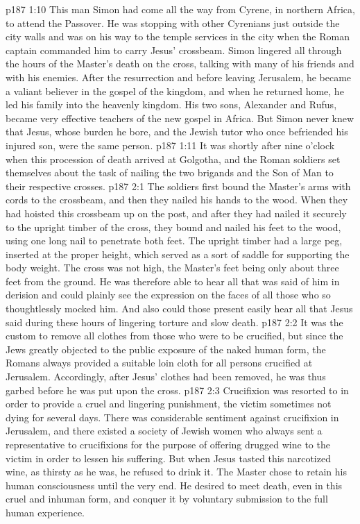 \pc \vs p187 1:10 This man Simon had come all the way from Cyrene, in northern Africa, to attend the Passover. He was stopping with other Cyrenians just outside the city walls and was on his way to the temple services in the city when the Roman captain commanded him to carry Jesus’ crossbeam. Simon lingered all through the hours of the Master’s death on the cross, talking with many of his friends and with his enemies. After the resurrection and before leaving Jerusalem, he became a valiant believer in the gospel of the kingdom, and when he returned home, he led his family into the heavenly kingdom. His two sons, Alexander and Rufus, became very effective teachers of the new gospel in Africa. But Simon never knew that Jesus, whose burden he bore, and the Jewish tutor who once befriended his injured son, were the same person.
\pc \vs p187 1:11 It was shortly after nine o’clock when this procession of death arrived at Golgotha, and the Roman soldiers set themselves about the task of nailing the two brigands and the Son of Man to their respective crosses.\plusone
{}
\vs p187 2:1 The soldiers first bound the Master’s arms with cords to the crossbeam, and then they nailed his hands to the wood. When they had hoisted this crossbeam up on the post, and after they had nailed it securely to the upright timber of the cross, they bound and nailed his feet to the wood, using one long nail to penetrate both feet. The upright timber had a large peg, inserted at the proper height, which served as a sort of saddle for supporting the body weight. The cross was not high, the Master’s feet being only about three feet from the ground. He was therefore able to hear all that was said of him in derision and could plainly see the expression on the faces of all those who so thoughtlessly mocked him. And also could those present easily hear all that Jesus said during these hours of lingering torture and slow death.
\vs p187 2:2 It was the custom to remove all clothes from those who were to be crucified, but since the Jews greatly objected to the public exposure of the naked human form, the Romans always provided a suitable loin cloth for all persons crucified at Jerusalem. Accordingly, after Jesus’ clothes had been removed, he was thus garbed before he was put upon the cross.
\vs p187 2:3 Crucifixion was resorted to in order to provide a cruel and lingering punishment, the victim sometimes not dying for several days. There was considerable sentiment against crucifixion in Jerusalem, and there existed a society of Jewish women who always sent a representative to crucifixions for the purpose of offering drugged wine to the victim in order to lessen his suffering. But when Jesus tasted this narcotized wine, as thirsty as he was, he refused to drink it. The Master chose to retain his human consciousness until the very end. He desired to meet death, even in this cruel and inhuman form, and conquer it by voluntary submission to the full human experience.
